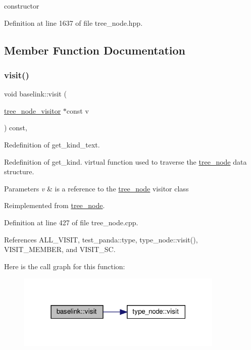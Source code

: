 constructor 



Definition at line 1637 of file tree\+\_\+node.\+hpp.



\subsection{Member Function Documentation}
\mbox{\label{structbaselink_a29dcaf2f07ad2369231426497d482ef0}} 
\subsubsection{\texorpdfstring{visit()}{visit()}}
{\footnotesize\ttfamily void baselink\+::visit (\begin{DoxyParamCaption}\item[{\hyperlink{classtree__node__visitor}{tree\+\_\+node\+\_\+visitor} $\ast$const}]{v }\end{DoxyParamCaption}) const\hspace{0.3cm}{\ttfamily [override]}, {\ttfamily [virtual]}}



Redefinition of get\+\_\+kind\+\_\+text. 

Redefinition of get\+\_\+kind. virtual function used to traverse the \hyperlink{classtree__node}{tree\+\_\+node} data structure. 
\begin{DoxyParams}{Parameters}
{\em v} & is a reference to the \hyperlink{classtree__node}{tree\+\_\+node} visitor class \\
\hline
\end{DoxyParams}


Reimplemented from \hyperlink{classtree__node_aa9abba3f1b30e0be80b4a56b188c6ecc}{tree\+\_\+node}.



Definition at line 427 of file tree\+\_\+node.\+cpp.



References A\+L\+L\+\_\+\+V\+I\+S\+IT, test\+\_\+panda\+::type, type\+\_\+node\+::visit(), V\+I\+S\+I\+T\+\_\+\+M\+E\+M\+B\+ER, and V\+I\+S\+I\+T\+\_\+\+SC.

Here is the call graph for this function\+:
\nopagebreak
\begin{figure}[H]
\begin{center}
\leavevmode
\includegraphics[width=279pt]{da/dda/structbaselink_a29dcaf2f07ad2369231426497d482ef0_cgraph}
\end{center}
\end{figure}


